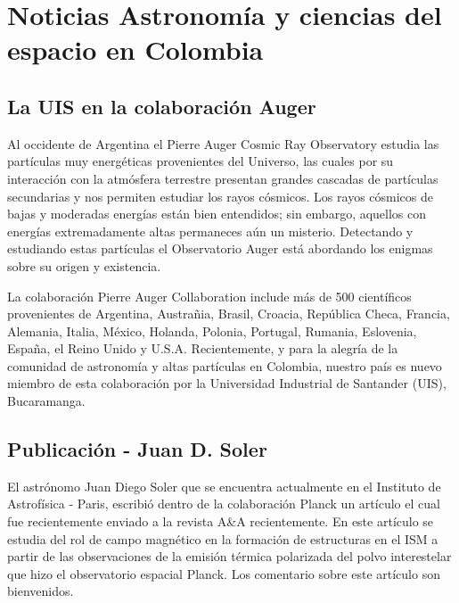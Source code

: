 \documentclass{book}
\begin{document}
\tableofcontents{}




\renewcommand\thesection{\arabic{section}}
\renewcommand\thesubsection{\arabic{subsection}}

\section*{Noticias Astronomía y ciencias del espacio en Colombia}
\subsection{La UIS en la colaboración Auger}
Al occidente de Argentina el Pierre Auger Cosmic Ray Observatory estudia las partículas muy energéticas provenientes del Universo, las cuales por su interacción con la atmósfera terrestre presentan grandes cascadas de partículas secundarias y nos permiten estudiar los rayos cósmicos. Los rayos cósmicos de bajas y moderadas energías están bien entendidos; sin embargo, aquellos con energías extremadamente altas permaneces aún un misterio. Detectando y estudiando estas partículas el Observatorio Auger está abordando los enigmas sobre su origen y existencia.

La colaboración Pierre Auger Collaboration include más de 500 científicos provenientes de Argentina, Austrañia, Brasil, Croacia, República Checa, Francia, Alemania, Italia, México, Holanda, Polonia, Portugal, Rumania, Eslovenia, España, el Reino Unido y U.S.A. Recientemente, y para la alegría de la comunidad de astronomía y altas partículas en Colombia, nuestro país es nuevo miembro de esta colaboración por la Universidad Industrial de Santander (UIS), Bucaramanga. \\


\subsection{Publicación - Juan D. Soler}

El astrónomo Juan Diego Soler que se encuentra actualmente en el Instituto de Astrofísica - Paris,  escribió dentro de la colaboración Planck un artículo el cual fue recientemente enviado a la revista A\&A recientemente.
En este artículo se estudia del rol de campo magnético en la formación de estructuras en el ISM a partir de las observaciones de la emisión térmica polarizada del polvo interestelar que hizo el observatorio espacial Planck. Los comentario sobre este artículo son bienvenidos.
\end{document}
